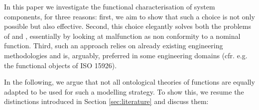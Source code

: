 \documentclass[
]{ceurart}
\begin{document}
In this paper we investigate the functional characterisation of system components, for three reasons: first, we aim to show that such a choice is not only possible but also effective. Second, this choice elegantly solves both the problems of  and , essentially by looking at malfunction as non conformity to a nominal function. Third, such an approach relies on already existing engineering methodologies and is, arguably, preferred in some engineering domains (cfr. e.g. the functional objects of ISO 15926).

In the following, we argue that not all ontological theories of functions are equally adapted to be used for such a modelling strategy. To show this, we resume the distinctions introduced in Section \ref{sec:literature} and discuss them: 
\end{document}
